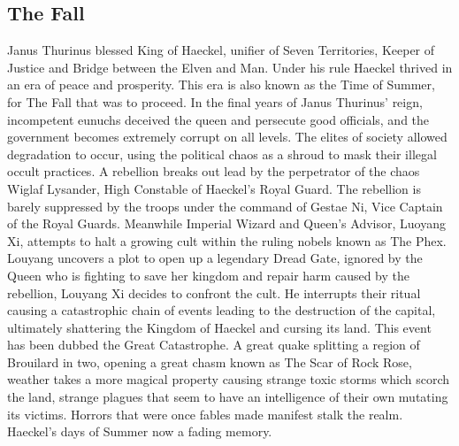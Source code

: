 \begin{multicols}{2}
\subsection{The Fall} Janus Thurinus blessed King of Haeckel, unifier of Seven Territories, Keeper of Justice and Bridge between the Elven and Man. Under his rule Haeckel thrived in an era of peace and prosperity. This era is also known as the Time of Summer, for The Fall that was to proceed.
In the final years of Janus Thurinus' reign, incompetent eunuchs deceived the queen and persecute good officials, and the government becomes extremely corrupt on all levels. The elites of society allowed degradation to occur, using the political chaos as a shroud to mask their illegal occult practices. A rebellion breaks out lead by the perpetrator of the chaos Wiglaf Lysander, High Constable of Haeckel’s Royal Guard. The rebellion is barely suppressed by the troops under the command of Gestae Ni, Vice Captain of the Royal Guards. Meanwhile Imperial Wizard and Queen's Advisor, Luoyang Xi, attempts to halt a growing cult within the ruling nobels known as The Phex. Louyang uncovers a plot to open up a legendary Dread Gate, ignored by the Queen who is fighting to save her kingdom and repair harm caused by the rebellion, Louyang Xi decides to confront the cult. He interrupts their ritual causing a catastrophic chain of events leading to the destruction of the capital, ultimately shattering the Kingdom of Haeckel and cursing its land. This event has been dubbed the Great Catastrophe. A great quake splitting a region of Brouilard in two, opening a great chasm known as The Scar of Rock Rose, weather takes a more magical property causing strange toxic storms which scorch the land, strange plagues that seem to have an intelligence of their own mutating its victims. Horrors that were once fables made manifest stalk the realm. Haeckel’s days of Summer now a fading memory.


\end{multicols}
